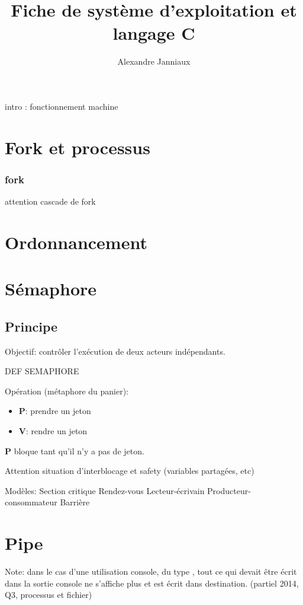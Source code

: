 \documentclass[9pt,twocolumn,a4paper]{article}
\title{Fiche de système d'exploitation et langage C}
\author{Alexandre Janniaux}
\begin{document}
\maketitle

intro : fonctionnement machine

\section{Fork et processus}

\subsubsection{fork}
attention cascade de fork

\section{Ordonnancement}



\section{Sémaphore}

\subsection{Principe}
Objectif: contrôler l'exécution de deux acteurs indépendants.

DEF SEMAPHORE

Opération (métaphore du panier): 
\begin{itemize} 
    \item \textbf{P}: prendre un jeton
    \item \textbf{V}: rendre un jeton
\end{itemize}

\textbf{P} bloque tant qu'il n'y a pas de jeton. 

Attention situation d'interblocage et safety (variables partagées, etc)

Modèles:
Section critique
Rendez-vous
Lecteur-\'ecrivain
Producteur-consommateur
Barrière

\section{Pipe}

Note: dans le cas d'une utilisation console, du type , tout ce qui devait être écrit dans la sortie console ne s'affiche plus et est écrit dans destination. (partiel 2014, Q3, processus et fichier)
\end{document}
